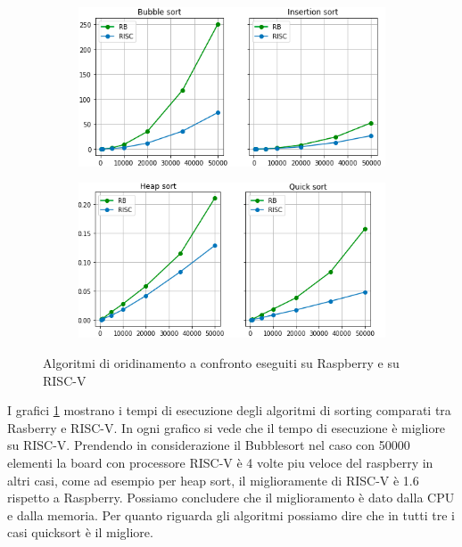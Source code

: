 \documentclass[12pt,a4paper]{report}
\begin{document}
\begin{figure}[htbp]
     \centering
     \begin{subfigure}[t]{0.49\textwidth}
         \centering
         \includegraphics[width=\textwidth]{Img/GraficiSorting/BISort_RB.png}
        
     \end{subfigure}
     \hfill
     \begin{subfigure}[t]{0.49\textwidth}
         \centering
         \includegraphics[width=\textwidth]{Img/GraficiSorting/HQSort_RB.png}
         
     \end{subfigure}

   \caption{Algoritmi di oridinamento a confronto eseguiti su Raspberry e su RISC-V}
   \label{Fig:AllSort_RB}
\end{figure}

I grafici \ref{Fig:AllSort_RB} mostrano i tempi di esecuzione degli algoritmi di sorting comparati tra Rasberry e RISC-V. In ogni grafico si vede che il tempo di esecuzione è migliore su RISC-V. Prendendo in considerazione il Bubblesort nel caso con 50000 elementi la board con processore RISC-V è 4 volte piu veloce del raspberry in altri casi, come ad esempio per heap sort, il miglioramente di RISC-V è 1.6 rispetto a Raspberry. Possiamo concludere che il miglioramento è dato dalla CPU e dalla memoria.  Per quanto riguarda gli algoritmi possiamo dire che in tutti tre i casi quicksort è il migliore.
\end{document}
